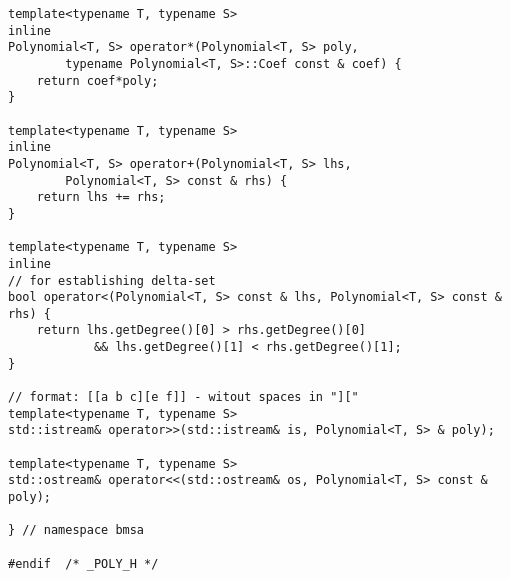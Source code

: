 \begin{lstlisting}
template<typename T, typename S>
inline
Polynomial<T, S> operator*(Polynomial<T, S> poly,
        typename Polynomial<T, S>::Coef const & coef) {
    return coef*poly;
}

template<typename T, typename S>
inline
Polynomial<T, S> operator+(Polynomial<T, S> lhs,
        Polynomial<T, S> const & rhs) {
    return lhs += rhs;
}

template<typename T, typename S>
inline
// for establishing delta-set
bool operator<(Polynomial<T, S> const & lhs, Polynomial<T, S> const & rhs) {
    return lhs.getDegree()[0] > rhs.getDegree()[0]
            && lhs.getDegree()[1] < rhs.getDegree()[1];
}

// format: [[a b c][e f]] - witout spaces in "]["
template<typename T, typename S>
std::istream& operator>>(std::istream& is, Polynomial<T, S> & poly);

template<typename T, typename S>
std::ostream& operator<<(std::ostream& os, Polynomial<T, S> const & poly);

} // namespace bmsa

#endif  /* _POLY_H */
\end{lstlisting}

